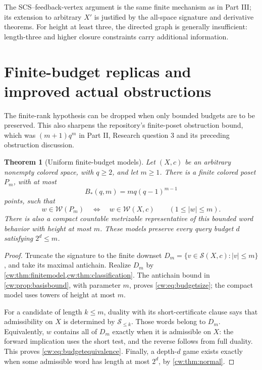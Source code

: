 \documentclass[11pt,letterpaper]{article}
\numberwithin{equation}{section}
\newtheorem{theorem}{Theorem}[section]
\theoremstyle{definition}
\theoremstyle{remark}
\theoremstyle{definition}
\newcommand{\W}{\mathcal W}
\newcommand{\len}[1]{\lvert #1\rvert}
\newcommand{\cwSig}{\mathcal S}
\begin{document}
The SCS--feedback-vertex argument is the same finite mechanism as in Part III;
its extension to arbitrary $X'$ is justified by the all-space signature
and derivative theorems. For height at least three, the directed graph is
generally insufficient: length-three and higher closure constraints carry
additional information.

\section{Finite-budget replicas and improved actual obstructions}
\label{cw:sec:budget}

The finite-rank hypothesis can be dropped when only bounded budgets are to
be preserved. This also sharpens the repository's finite-poset obstruction
bound, which was $(m+1)q^m$ in Part II, Research question 3 and its preceding
obstruction discussion.

\begin{theorem}[Uniform finite-budget models]\label{cw:thm:budgetmodel}
Let $(X,c)$ be an arbitrary nonempty colored space, with $q\ge2$, and let
$m\ge1$. There is a finite colored poset $P_m$, with at most
\begin{equation}\label{cw:eq:budgetsize}
 B_*(q,m)=mq(q-1)^{m-1}
\end{equation}
points, such that
\begin{equation}\label{cw:eq:budgetequivalence}
 w\in\W(P_m)\quad\Longleftrightarrow\quad w\in\W(X,c)
 \qquad(1\le\len w\le m).
\end{equation}
There is also a compact countable metrizable representative of this bounded
word behavior with height at most $m$. These models preserve every query
budget $d$ satisfying $2^d\le m$.
\end{theorem}
\begin{proof}
Truncate the signature to the finite downset
$D_m=\{v\in\cwSig(X,c):\len v\le m\}$, and take its maximal antichain.
Realize $D_m$ by \cref{cw:thm:finitemodel,cw:thm:classification}. The antichain
bound in \cref{cw:prop:basisbound}, with parameter $m$, proves
\eqref{cw:eq:budgetsize}; the compact model uses towers of height at most $m$.

For a candidate of length $k\le m$, duality with its short-certificate
clause says that admissibility on $X$ is determined by $\cwSig_{\le k}$.
Those words belong to $D_m$. Equivalently, $w$ contains all of $D_m$ exactly
when it is admissible on $X$: the forward implication uses the short test,
and the reverse follows from full duality. This proves
\eqref{cw:eq:budgetequivalence}. Finally, a depth-$d$ game exists exactly when
some admissible word has length at most $2^d$, by \cref{cw:thm:normal}.
\end{proof}
\end{document}
